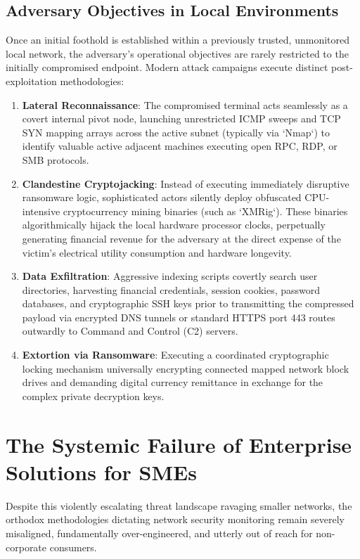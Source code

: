 \subsection{Adversary Objectives in Local Environments}
Once an initial foothold is established within a previously trusted, unmonitored local network, the adversary's operational objectives are rarely restricted to the initially compromised endpoint. Modern attack campaigns execute distinct post-exploitation methodologies:
\begin{enumerate}
    \item \textbf{Lateral Reconnaissance}: The compromised terminal acts seamlessly as a covert internal pivot node, launching unrestricted ICMP sweeps and TCP SYN mapping arrays across the active subnet (typically via `Nmap`) to identify valuable active adjacent machines executing open RPC, RDP, or SMB protocols.
    \item \textbf{Clandestine Cryptojacking}: Instead of executing immediately disruptive ransomware logic, sophisticated actors silently deploy obfuscated CPU-intensive cryptocurrency mining binaries (such as `XMRig`). These binaries algorithmically hijack the local hardware processor clocks, perpetually generating financial revenue for the adversary at the direct expense of the victim's electrical utility consumption and hardware longevity.
    \item \textbf{Data Exfiltration}: Aggressive indexing scripts covertly search user directories, harvesting financial credentials, session cookies, password databases, and cryptographic SSH keys prior to transmitting the compressed payload via encrypted DNS tunnels or standard HTTPS port 443 routes outwardly to Command and Control (C2) servers.
    \item \textbf{Extortion via Ransomware}: Executing a coordinated cryptographic locking mechanism universally encrypting connected mapped network block drives and demanding digital currency remittance in exchange for the complex private decryption keys.
\end{enumerate}

\section{The Systemic Failure of Enterprise Solutions for SMEs}
Despite this violently escalating threat landscape ravaging smaller networks, the orthodox methodologies dictating network security monitoring remain severely misaligned, fundamentally over-engineered, and utterly out of reach for non-corporate consumers. 

